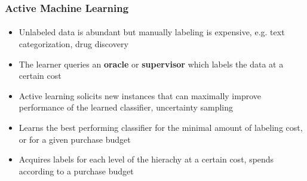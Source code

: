 \documentclass{beamer}
\begin{document}
\begin{frame}
    \frametitle{Active Machine Learning}     %
    \framesubtitle{}
\begin{itemize}
  \item Unlabeled data is abundant but manually labeling is expensive, e.g. text categorization, drug discovery
  \item The learner queries an \textbf{oracle} or \textbf{supervisor} which labels the data at a certain cost
  \item Active learning solicits new instances that can maximally improve performance of the learned classifier, uncertainty sampling
  \item Learns the best performing classifier for the minimal amount of labeling cost,
  or for a given purchase budget
  \item Acquires labels for each level of the hierachy at a certain cost, spends according to a purchase budget
\end{itemize}
\end{frame}
\end{document}
